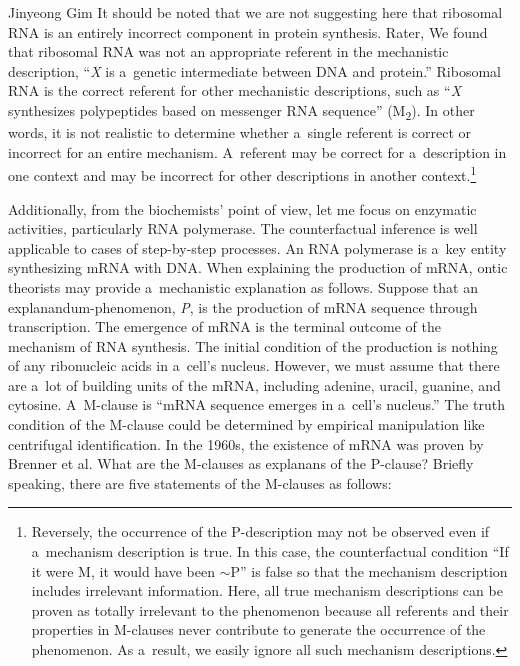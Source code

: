 \begin{artengenv}{Jinyeong Gim}
It should be noted that we are not suggesting here that ribosomal RNA is an entirely incorrect component in protein synthesis. Rater, We found that ribosomal RNA was not an appropriate referent in the mechanistic description, ``\textit{X} is a~genetic intermediate between DNA and protein.'' Ribosomal RNA is the correct referent for other mechanistic descriptions, such as ``\textit{X} synthesizes polypeptides based on messenger RNA sequence'' (M\textsubscript{2}). In other words, it is not realistic to determine whether a~single referent is correct or incorrect for an entire mechanism. A~referent may be correct for a~description in one context and may be incorrect for other descriptions in another context.\footnote{Reversely, the occurrence of the P-description may not be observed even if a~mechanism description is true. In this case, the counterfactual condition ``If it were M, it would have been $\sim$P'' is false so that the mechanism description includes irrelevant information. Here, all true mechanism descriptions can be proven as totally irrelevant to the phenomenon because all referents and their properties in M-clauses never contribute to generate the occurrence of the phenomenon. As a~result, we easily ignore all such mechanism descriptions.}

Additionally, from the biochemists' point of view, let me focus on enzymatic activities, particularly RNA polymerase. The counterfactual inference is well applicable to cases of step-by-step processes. An RNA polymerase is a~key entity synthesizing mRNA with DNA. When explaining the production of mRNA, ontic theorists may provide a~mechanistic explanation as follows. Suppose that an explanandum-phenomenon, \textit{P}, is the production of mRNA sequence through transcription. The emergence of mRNA is the terminal outcome of the mechanism of RNA synthesis. The initial condition of the production is nothing of any ribonucleic acids in a~cell's nucleus. However, we must assume that there are a~lot of building units of the mRNA, including adenine, uracil, guanine, and cytosine. A~M-clause is ``mRNA sequence emerges in a~cell's nucleus.'' The truth condition of the M-clause could be determined by empirical manipulation like centrifugal identification. In the 1960s, the existence of mRNA was proven by Brenner et al. What are the M-clauses as explanans of the P-clause? Briefly speaking, there are five statements of the M-clauses as follows:


\end{artengenv}
